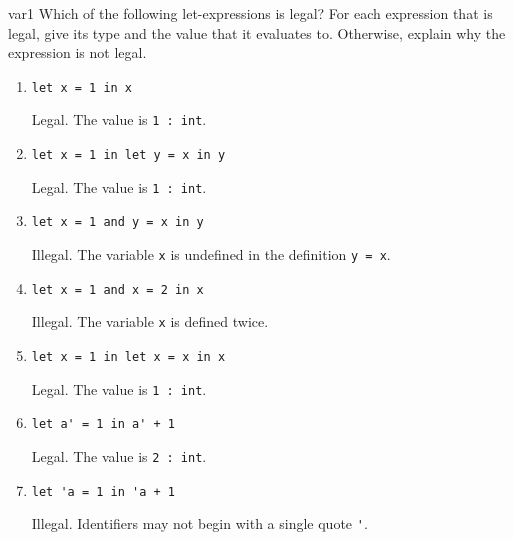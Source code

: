 %
%
%
\exercises

\begin{exercise}{var1}
Which of the following let-expressions is legal? 
For each expression that is legal, give its type and the value that it evaluates to.
Otherwise, explain why the expression is not legal.

\begin{enumerate}
\item \lstinline!let x = 1 in x!

\begin{answer}\ifanswers
Legal.  The value is \hbox{\lstinline/1 : int/}.
\fi\end{answer}

\item \lstinline!let x = 1 in let y = x in y!

\begin{answer}\ifanswers
Legal.  The value is \hbox{\lstinline/1 : int/}.
\fi\end{answer}

\item \lstinline!let x = 1 and y = x in y!

\begin{answer}\ifanswers
Illegal.  The variable \hbox{\lstinline/x/} is undefined in the definition \hbox{\lstinline/y = x/}.
\fi\end{answer}

\item \lstinline!let x = 1 and x = 2 in x!

\begin{answer}\ifanswers
Illegal.  The variable \hbox{\lstinline/x/} is defined twice.
\fi\end{answer}

\item \lstinline!let x = 1 in let x = x in x!

\begin{answer}\ifanswers
Legal.  The value is \hbox{\lstinline/1 : int/}.
\fi\end{answer}

\item \lstinline!let a' = 1 in a' + 1!

\begin{answer}\ifanswers
Legal.  The value is \hbox{\lstinline/2 : int/}.
\fi\end{answer}

\item \lstinline!let 'a = 1 in 'a + 1!

\begin{answer}\ifanswers
Illegal.  Identifiers may not begin with a single quote \hbox{\lstinline/'/}.
\fi\end{answer}


\end{enumerate}
\end{exercise}
